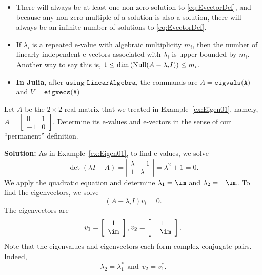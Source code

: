 \begin{tcolorbox}[sharp corners, colback=green!30, colframe=green!80!blue, title=\textbf{\large Fundamental Theorem of Algebra (and a bit More)}]
\begin{itemize}
    \item There will always be at least one non-zero solution to \eqref{eq:EvectorDef}, and because any non-zero multiple of a solution is also a solution, there will always be an infinite number of solutions to \eqref{eq:EvectorDef}. 
    
    \item If $\lambda_i$ is a repeated e-value with algebraic multiplicity $m_i$, then the number of linearly independent e-vectors associated with $\lambda_i$ is upper bounded by $m_i$. Another way to say this is, $1 \le \dim\left({\rm Null}(A-\lambda_i I) \right) \le m_i$.
    
    \item \textbf{In Julia}, after $\texttt{using LinearAlgebra}$, the commands are $\Lambda = \texttt{eigvals(A)}$ and $V=\texttt{eigvecs(A)}$
\end{itemize}

\end{tcolorbox}

\begin{example}
\label{ex:Eigen02} Let $A$ be the $2 \times 2$ real matrix that we treated in Example~\ref{ex:Eigen01}, namely,
 $A=\left[\begin{array}{rr}
    0 & 1\\
    -1 & 0
    \end{array}\right].$
Determine its e-values and e-vectors in the sense of our ``permanent'' definition. 
\end{example}

\textbf{Solution:} As in Example~\ref{ex:Eigen01}, to find e-values, we solve 
$$\det(\lambda I-A)= \left| \begin{array}{rr}
    \lambda & -1\\
    1 &\lambda
    \end{array} \right| =\lambda^2+1=0.$$
   We apply the quadratic equation and determine $\lambda_1 = \im$ and $\lambda_2= - \im$.  To find the eigenvectors, we solve 
   $$(A-\lambda_{i}I)v_i=0.$$
    The eigenvectors are $$v_{1}=\left[\begin{array}{c}
        1\\
        \im
    \end{array}\right],v_{2}=\left[\begin{array}{c}
        1\\
        -\im
    \end{array}\right].$$
Note that the eigenvalues and eigenvectors each form complex conjugate pairs. Indeed,
$$\lambda_2 = \lambda_1^\ast~~\text{and}~~v_2 = v_1^\ast. $$
\Qed

